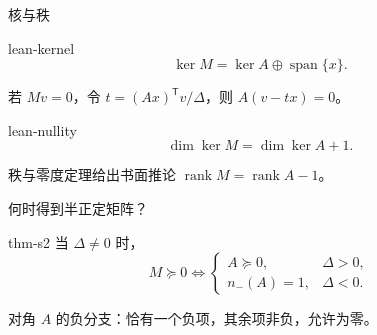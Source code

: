 \documentclass{beamer}
\begin{document}
\begin{frame}{核与秩}
\begin{bookresult}{lean-kernel}
\[
\ker M=\ker A\oplus\operatorname{span}\{x\}.
\]
\end{bookresult}
若 $Mv=0$，令 $t=(Ax)^{\mathsf T}v/\Delta$，则 $A(v-tx)=0$。
\begin{bookresult}{lean-nullity}
\[
\dim\ker M=\dim\ker A+1.
\]
\end{bookresult}
秩与零度定理给出书面推论 $\operatorname{rank}M=\operatorname{rank}A-1$。
\end{frame}
\begin{frame}{何时得到半正定矩阵？}
\begin{bookresult}{thm-s2}
当 $\Delta\ne0$ 时，
\[
M\succeq0\iff
\begin{cases}
A\succeq0,&\Delta>0,\\
n_-(A)=1,&\Delta{}<0.
\end{cases}
\]
\end{bookresult}
对角 $A$ 的负分支：恰有一个负项，其余项非负，允许为零。
\end{frame}
\end{document}
